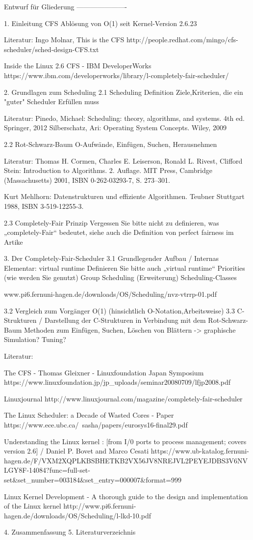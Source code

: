 Entwurf für Gliederung
----------------------

1. Einleitung
	CFS Ablösung von O(1) seit Kernel-Version 2.6.23

	Literatur:
	Ingo Molnar, This is the CFS
		http://people.redhat.com/mingo/cfs-scheduler/sched-design-CFS.txt

	Inside the Linux 2.6 CFS - IBM DeveloperWorks
		https://www.ibm.com/developerworks/library/l-completely-fair-scheduler/

2. Grundlagen zum Scheduling
2.1 Scheduling
	Definition
	Ziele,Kriterien, die ein "guter" Scheduler Erfüllen muss

	Literatur:
	Pinedo, Michael: Scheduling: theory, algorithms, and systems. 4th ed.
	Springer, 2012
	Silberschatz, Ari: Operating System Concepts. Wiley, 2009

2.2 Rot-Schwarz-Baum
	O-Aufwände, Einfügen, Suchen, Herausnehmen

	Literatur:
	Thomas H. Cormen, Charles E. Leiserson, Ronald L. Rivest, Clifford Stein: Introduction to Algorithms. 2. Auflage. MIT Press, Cambridge (Massachusetts) 2001, ISBN 0-262-03293-7, S. 273–301.

	Kurt Mehlhorn: Datenstrukturen und effiziente Algorithmen. Teubner Stuttgart 1988, ISBN 3-519-12255-3.

2.3 Completely-Fair Prinzip
	Vergessen Sie bitte nicht zu definieren, was „completely-Fair“ bedeutet, siehe auch die Definition von perfect fairness im Artike

3. Der Completely-Fair-Scheduler
  	3.1 Grundlegender Aufbau / Internas
		Elementar: virtual runtime
			Definieren Sie bitte auch „virtual runtime“
		Priorities (wie werden Sie genutzt)
		Group Scheduling (Erweiterung)
		Scheduling-Classes
		
		www.pi6.fernuni-hagen.de/downloads/OS/Scheduling/nvz-vtrrp-01.pdf
	
	3.2 Vergleich zum Vorgänger O(1) (hinsichtlich O-Notation,Arbeitsweise)
	3.3 C-Strukturen / Darstellung der C-Strukturen in Verbindung mit dem Rot-Schwarz-Baum
		Methoden zum Einfügen, Suchen, Löschen von Blättern -> graphische Simulation?
		Tuning?

	Literatur:

	The CFS - Thomas Gleixner - Linuxfoundation Japan Symposium
		https://www.linuxfoundation.jp/jp_uploads/seminar20080709/lfjp2008.pdf

	Linuxjournal
		http://www.linuxjournal.com/magazine/completely-fair-scheduler

	The Linux Scheduler: a Decade of Wasted Cores - Paper
		https://www.ece.ubc.ca/~sasha/papers/eurosys16-final29.pdf

	Understanding the Linux kernel : [from I/0 ports to process management; covers version 2.6] / Daniel P. Bovet and Marco Cesati
		https://www.ub-katalog.fernuni-hagen.de/F/VXM2XQPLKBSBHETKB2VX56JV8NREJVL2PEYEJDBS3V6NVLGY8F-14084?func=full-set-set&set_number=003184&set_entry=000007&format=999

	Linux Kernel Development - A thorough guide to the design and implementation of the Linux kernel
		http://www.pi6.fernuni-hagen.de/downloads/OS/Scheduling/l-lkd-10.pdf

4. Zusammenfassung
5. Literaturverzeichnis
